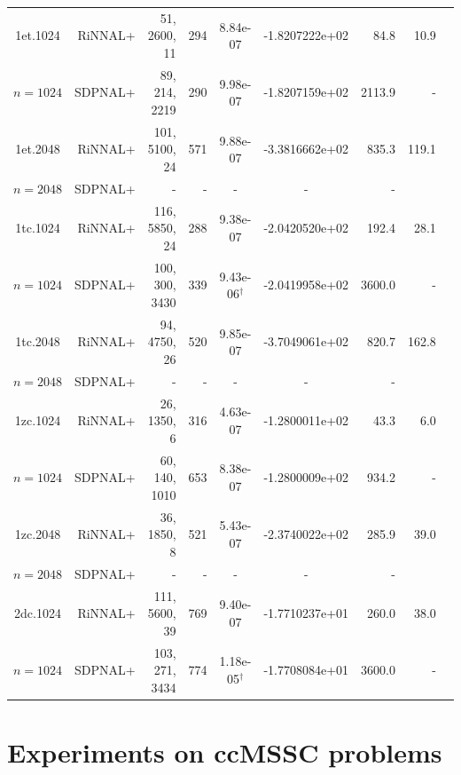 \documentclass[11pt]{article}
\theoremstyle{plain}
\begin{document}
\begin{footnotesize}
\begin{longtable}[c]{crrrccrrr}
1et.1024& RiNNAL+ & 51, 2600, 11 & 294 & 8.84e-07 & -1.8207222e+02 & 84.8 &10.9 \\ 
$n=1024$ & SDPNAL+ & 89, 214, 2219 & 290& 9.98e-07 & -1.8207159e+02 & 2113.9 & - \\ [3pt] 

1et.2048& RiNNAL+ & 101, 5100, 24 & 571 & 9.88e-07 & -3.3816662e+02 & 835.3 &119.1 \\ 
$n=2048$ & SDPNAL+ & - & - & - & - & - \\ [3pt] 

1tc.1024& RiNNAL+ & 116, 5850, 24 & 288 & 9.38e-07 & -2.0420520e+02 & 192.4 &28.1 \\ 
$n=1024$ & SDPNAL+ & 100, 300, 3430 & 339& 9.43e-06$^{\dagger}$ & -2.0419958e+02 & 3600.0 & - \\ [3pt] 

1tc.2048& RiNNAL+ & 94, 4750, 26 & 520 & 9.85e-07 & -3.7049061e+02 & 820.7 &162.8 \\ 
$n=2048$ & SDPNAL+ & - & - & - & - & - \\ [3pt] 

1zc.1024& RiNNAL+ & 26, 1350, 6 & 316 & 4.63e-07 & -1.2800011e+02 & 43.3 &6.0 \\ 
$n=1024$ & SDPNAL+ & 60, 140, 1010 & 653& 8.38e-07 & -1.2800009e+02 & 934.2 & - \\ [3pt] 

1zc.2048& RiNNAL+ & 36, 1850, 8 & 521 & 5.43e-07 & -2.3740022e+02 & 285.9 &39.0 \\ 
$n=2048$ & SDPNAL+ & - & - & - & - & - \\ [3pt] 

2dc.1024& RiNNAL+ & 111, 5600, 39 & 769 & 9.40e-07 & -1.7710237e+01 & 260.0 &38.0 \\ 
$n=1024$ & SDPNAL+ & 103, 271, 3434 & 774& 1.18e-05$^{\dagger}$ & -1.7708084e+01 & 3600.0 & - \\ [3pt] 



\end{longtable}
\end{footnotesize}



\section{Experiments on ccMSSC problems}
\label{appendix-ccMSSC}
\end{document}

